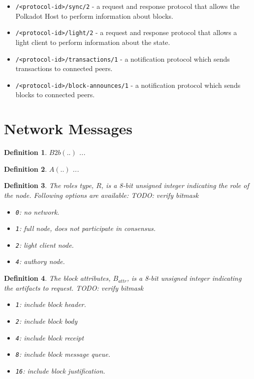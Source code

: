 \documentclass{book}
\newtheorem{definition}{Definition}
\newcommand{\todo}[1]{}
\renewcommand{\todo}[1]{{\color{red} TODO: {#1}}}
\begin{document}
\begin{itemize}
    \item \verb|/<protocol-id>/sync/2| - a request and response protocol that
    allows the Polkadot Host to perform information about blocks.
    \item \verb|/<protocol-id>/light/2| - a request and response protocol that
    allows a light client to perform information about the state.
    \item \verb|/<protocol-id>/transactions/1| - a notification protocol which
    sends transactions to connected peers.
    \item \verb|/<protocol-id>/block-announces/1| - a notification protocol
    which sends blocks to connected peers.
\end{itemize}

\section{Network Messages}

\begin{definition}
    \label{defn-blake2b}
    $B2b(..)$ ...
\end{definition}

\begin{definition}
    \label{defn-byte-array}
    $A(..)$ ...
\end{definition}

\begin{definition}
    \label{defn-roles}
    The roles type, $R$, is a 8-bit unsigned integer indicating the role of the
    node. Following options are available: \todo{verify bitmask}

    \begin{itemize}
        \item \verb|0|: no network.
        \item \verb|1|: full node, does not participate in consensus.
        \item \verb|2|: light client node.
        \item \verb|4|: authory node.
    \end{itemize}
\end{definition}

\begin{definition}
    \label{defn-block-attributes}
    The block attributes, $B_{attr}$, is a 8-bit unsigned integer indicating the
    artifacts to request. \todo{verify bitmask}

    \begin{itemize}
        \item \verb|1|: include block header.
        \item \verb|2|: include block body
        \item \verb|4|: include block receipt
        \item \verb|8|: include block message queue.
        \item \verb|16|: include block justification.
    \end{itemize}
\end{definition}
\end{document}
